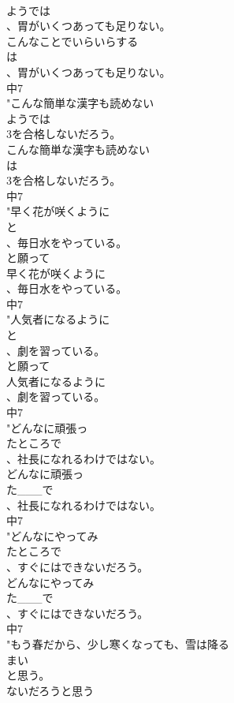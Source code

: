 \documentclass[8pt]{extreport}
\begin{document}
\begin{CJK}{UTF8}{min}
\\	ようでは
\\	、胃がいくつあっても足りない。
\\	こんなことでいらいらする
\\	は
\\	、胃がいくつあっても足りない。
\\	中7
\\	"こんな簡単な漢字も読めない
\\	ようでは
\\	3を合格しないだろう。
\\	こんな簡単な漢字も読めない
\\	は
\\	3を合格しないだろう。
\\	中7
\\	"早く花が咲くように
\\	と
\\	、毎日水をやっている。
\\	と願って	
\\	早く花が咲くように
\\	、毎日水をやっている。
\\	中7
\\	"人気者になるように
\\	と
\\	、劇を習っている。
\\	と願って	
\\	人気者になるように
\\	、劇を習っている。
\\	中7
\\	"どんなに頑張っ
\\	たところで
\\	、社長になれるわけではない。
\\	どんなに頑張っ
\\	た___で
\\	、社長になれるわけではない。
\\	中7
\\	"どんなにやってみ
\\	たところで
\\	、すぐにはできないだろう。
\\	どんなにやってみ
\\	た___で
\\	、すぐにはできないだろう。
\\	中7
\\	"もう春だから、少し寒くなっても、雪は降る
\\	まい
\\	と思う。
\\	ないだろうと思う	

\end{CJK}
\end{document}
